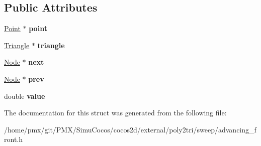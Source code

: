 \subsection*{Public Attributes}
\begin{DoxyCompactItemize}
\item 
\mbox{\label{structp2t_1_1Node_ae825ade9418e2389aec7fea656bc1de7}} 
\hyperlink{structp2t_1_1Point}{Point} $\ast$ {\bfseries point}
\item 
\mbox{\label{structp2t_1_1Node_a0cecbfa40442998424e36d1a01a9d9ac}} 
\hyperlink{classp2t_1_1Triangle}{Triangle} $\ast$ {\bfseries triangle}
\item 
\mbox{\label{structp2t_1_1Node_ac04749ecfcee79224cfbfa0d9c777902}} 
\hyperlink{structp2t_1_1Node}{Node} $\ast$ {\bfseries next}
\item 
\mbox{\label{structp2t_1_1Node_acb2eac44fd1da2ad95a7da88ddb548ee}} 
\hyperlink{structp2t_1_1Node}{Node} $\ast$ {\bfseries prev}
\item 
\mbox{\label{structp2t_1_1Node_a91f9e234953a33d2bd876a7a748c85ec}} 
double {\bfseries value}
\end{DoxyCompactItemize}


The documentation for this struct was generated from the following file\+:\begin{DoxyCompactItemize}
\item 
/home/pmx/git/\+P\+M\+X/\+Simu\+Cocos/cocos2d/external/poly2tri/sweep/advancing\+\_\+front.\+h\end{DoxyCompactItemize}
